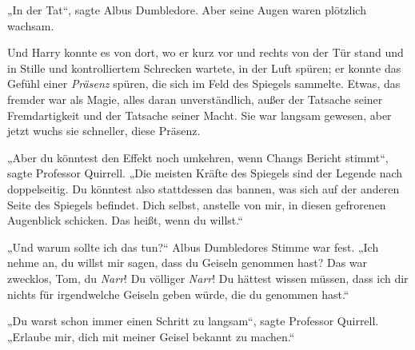 „In der Tat“, sagte Albus Dumbledore.
Aber seine Augen waren plötzlich wachsam.

Und Harry konnte es von dort, wo er kurz vor und rechts von der Tür stand und in Stille und kontrolliertem Schrecken wartete, in der Luft spüren; er konnte das Gefühl einer \emph{Präsenz} spüren, die sich im Feld des Spiegels sammelte. Etwas, das fremder war als Magie, alles daran unverständlich, außer der Tatsache seiner Fremdartigkeit und der Tatsache seiner Macht. Sie war langsam gewesen, aber jetzt wuchs sie schneller, diese Präsenz.

„Aber du könntest den Effekt noch umkehren, wenn Changs Bericht stimmt“, sagte Professor Quirrell.
„Die meisten Kräfte des Spiegels sind der Legende nach doppelseitig. Du könntest also stattdessen das bannen, was sich auf der anderen Seite des Spiegels befindet. Dich selbst, anstelle von mir, in diesen gefrorenen Augenblick schicken. Das heißt, wenn du willst.“

„Und warum sollte ich das tun?“ Albus Dumbledores Stimme war fest.
„Ich nehme an, du willst mir sagen, dass du Geiseln genommen hast? Das war zwecklos, Tom, du \emph{Narr}! Du völliger \emph{Narr}! Du hättest wissen müssen, dass ich dir nichts für irgendwelche Geiseln geben würde, die du genommen hast.“

„Du warst schon immer einen Schritt zu langsam“, sagte Professor Quirrell.
„Erlaube mir, dich mit meiner Geisel bekannt zu machen.“

